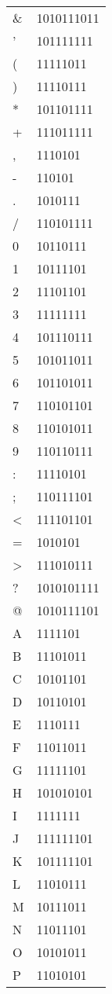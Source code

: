 \begin{longtable}{ l l }
			\&  & 1010111011 \\
			'   & 101111111 \\
			(   & 11111011 \\
			)   & 11110111 \\
			*   & 101101111 \\
			+   & 111011111 \\
			,   & 1110101 \\
			-   & 110101 \\
			.   & 1010111 \\
			/   & 110101111 \\
			0   & 10110111 \\
			1   & 10111101 \\
			2   & 11101101 \\
			3   & 11111111 \\
			4   & 101110111 \\
			5   & 101011011 \\
			6   & 101101011 \\
			7   & 110101101 \\
			8   & 110101011 \\
			9   & 110110111 \\
			:   & 11110101 \\
			;   & 110111101 \\
			<   & 111101101 \\
			=   & 1010101 \\
			>   & 111010111 \\
			?   & 1010101111 \\
			@   & 1010111101 \\
			A   & 1111101 \\
			B   & 11101011 \\
			C   & 10101101 \\
			D   & 10110101 \\
			E   & 1110111 \\
			F   & 11011011 \\
			G   & 11111101 \\
			H   & 101010101 \\
			I   & 1111111 \\
			J   & 111111101 \\
			K   & 101111101 \\
			L   & 11010111 \\
			M   & 10111011 \\
			N   & 11011101 \\
			O   & 10101011 \\
			P   & 11010101 \\

\end{longtable}
